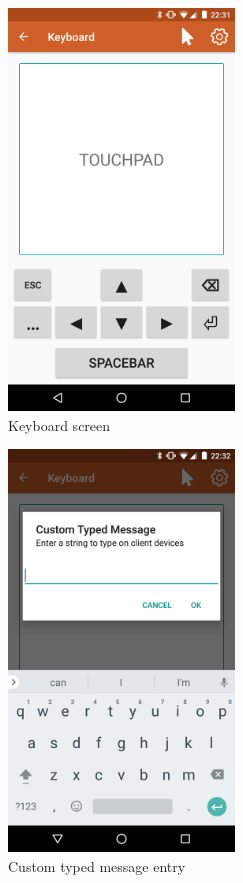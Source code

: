 \documentclass{sig-alternate}
\renewcommand\_{\textunderscore\allowbreak}  %
\begin{document}
\begin{figure}[hp]
	\hypertarget{fig:keyboard}{}
	\centering
	\includegraphics[width=6cm]{screenshots/keyboard}
	\caption{Keyboard screen}
\end{figure}

\begin{figure}[hp]
	\hypertarget{fig:custom\_type\_message}{}
	\centering
	\includegraphics[width=6cm]{screenshots/custom_type_message}
	\caption{Custom typed message entry}
\end{figure}
\end{document}
